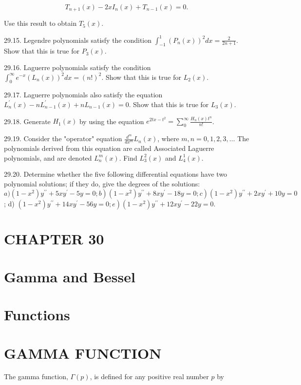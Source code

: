 \documentclass[10pt]{article}
\begin{document}
$$
T_{n+1}(x)-2 x I_{n}(x)+T_{n-1}(x)=0 .
$$

Use this result to obtain $T_{5}(x)$.

29.15. Legendre polynomials satisfy the condition $\int_{-1}^{1}\left(P_{n}(x)\right)^{2} d x=\frac{2}{2 n+1}$. Show that this is true for $P_{3}(x)$.

29.16. Laguerre polynomials satisfy the condition $\int_{0}^{\infty} e^{-x}\left(L_{n}(x)\right)^{2} d x=(n !)^{2}$. Show that this is true for $L_{2}(x)$.

29.17. Laguerre polynomials also satisfy the equation $L_{n}^{\prime}(x)-n L_{n-1}^{\prime}(x)+n L_{n-1}(x)=0$. Show that this is true for $L_{3}(x)$.

29.18. Generate $H_{1}(x)$ by using the equation $e^{2 t x-t^{2}}=\sum_{0}^{\infty} \frac{H_{n}(x) t^{n}}{n !}$.

29.19. Consider the "operator" equation $\frac{d^{m}}{d x^{m}} L_{n}(x)$, where $m, n=0,1,2,3, \ldots$ The polynomials derived from this equation are called Associated Laguerre polynomials, and are denoted $L_{n}^{m}(x)$. Find $L_{3}^{2}(x)$ and $L_{4}^{1}(x)$.

29.20. Determine whether the five following differential equations have two polynomial solutions; if they do, give the degrees of the solutions: $\left.\left.a)\left(1-x^{2}\right) y^{\prime \prime}+5 x y^{\prime}-5 y=0 ; b\right)\left(1-x^{2}\right) y^{\prime \prime}+8 x y^{\prime}-18 y=0 ; c\right)\left(1-x^{2}\right) y^{\prime \prime}+2 x y^{\prime}+10 y=0$; d) $\left.\left(1-x^{2}\right) y^{\prime \prime}+14 x y^{\prime}-56 y=0 ; e\right)\left(1-x^{2}\right) y^{\prime \prime}+12 x y^{\prime}-22 y=0$.

\section*{CHAPTER 30}
\section*{Gamma and Bessel}
\section*{Functions}
\section*{GAMMA FUNCTION}
The gamma function, $\Gamma(p)$, is defined for any positive real number $p$ by
\end{document}
